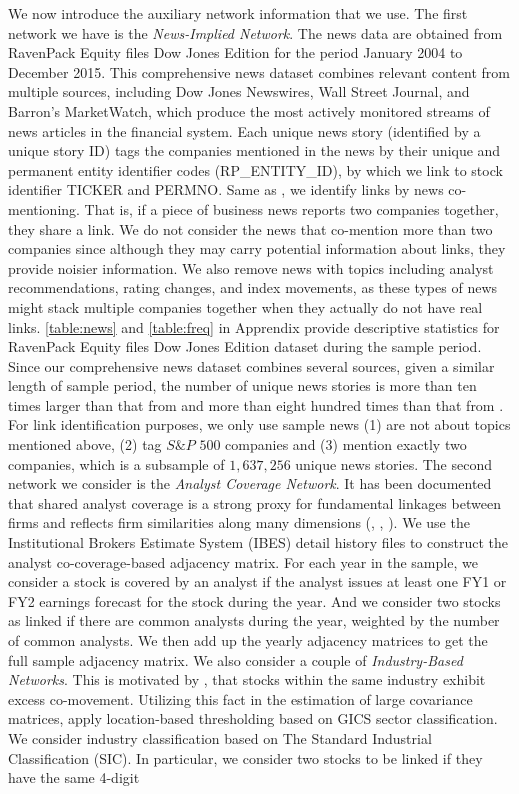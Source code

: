 We now introduce the auxiliary network information that we use. The first network we have is the \textit{News-Implied Network}. The news data are obtained from RavenPack Equity files Dow Jones Edition for the period January 2004 to December 2015. This comprehensive news dataset combines relevant content from multiple sources, including Dow Jones Newswires, Wall Street Journal, and Barron's MarketWatch, which produce the most actively monitored streams of news articles in the financial system. Each unique news story (identified by a unique story ID) tags the companies mentioned in the news by their unique and permanent entity identifier codes (RP\_ENTITY\_ID),  by which we link to stock identifier TICKER and PERMNO. Same as \cite{ge2022news}, we identify links by news co-mentioning. That is, if a piece of business news reports two companies together, they share a link. We do not consider the news that co-mention more than two companies since although they may carry potential information about links, they provide noisier information. We also remove news with topics including analyst recommendations, rating changes, and index movements, as these types of news might stack multiple companies together when they actually do not have real links. \autoref{table:news} and \autoref{table:freq} in Apprendix provide descriptive statistics for RavenPack Equity files Dow Jones Edition dataset during the sample period. Since our comprehensive news dataset combines several sources, given a similar length of sample period, the number of unique news stories is more than ten times larger than that from \cite{scherbina2015economic} and more than eight hundred times than that from \cite{schwenkler2019network}. For link identification purposes, we only use sample news (1) are not about topics mentioned above, (2) tag $S\& P$ $500$ companies and (3) mention exactly two companies, which is a subsample of $1,637,256$ unique news stories. The second network we consider is the \textit{Analyst Coverage Network}.  It has been documented that shared analyst coverage is a strong proxy for fundamental linkages between firms and reflects firm similarities along many dimensions (\cite{ali2020shared}, \citet{israelsen2016does}, \citet{kaustia2013common}). We use the Institutional Brokers Estimate System (IBES) detail history files to construct the analyst co-coverage-based adjacency matrix. For each year in the sample, we consider a stock is covered by an analyst if the analyst issues at least one FY1 or FY2 earnings forecast for the stock during the year. And we consider two stocks as linked if there are common analysts during the year, weighted by the number of common analysts. We then add up the yearly adjacency matrices to get the full sample adjacency matrix.  We also consider a couple of \textit{Industry-Based Networks}. This is motivated by \cite{moskowitz1999industries}, \citet{engelberg2018know} that stocks within the same industry exhibit excess co-movement.  Utilizing this fact in the estimation of large covariance matrices, \cite{fan2016incorporating} apply location-based thresholding based on GICS sector classification. We consider industry classification based on The Standard Industrial Classification (SIC). In particular, we consider two stocks to be linked if they have the same 4-digit 